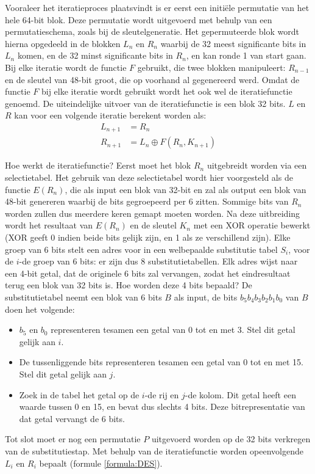 \documentclass{report}
\begin{document}
	Vooraleer het iteratieproces plaatsvindt is er eerst een initiële permutatie van het hele 64-bit blok. Deze permutatie wordt uitgevoerd met behulp van een permutatieschema, zoals bij de sleutelgeneratie. Het gepermuteerde blok wordt hierna opgedeeld in de blokken $L_n$ en $R_n$ waarbij de 32 meest significante bits in $L_n$ komen, en de 32 minst significante bits in $R_n$, en kan ronde 1 van start gaan. Bij elke iteratie wordt de functie $F$ gebruikt, die twee blokken manipuleert: $R_{n-1}$ en de sleutel van 48-bit groot, die op voorhand al gegenereerd werd. Omdat de functie $F$ bij elke iteratie wordt gebruikt wordt het ook wel de iteratiefunctie genoemd. De uiteindelijke uitvoer van de iteratiefunctie is een blok 32 bits. $L$ en $R$ kan voor een volgende iteratie berekent worden als:
	\begin{equation}
		\begin{split}
			L_{n + 1} & = R_{n} \\
			R_{n + 1} & = L_{n} \mathbin{\oplus} F(R_{n}, K_{n + 1})
		\end{split}
		\label{formula:DES}
	\end{equation}

	Hoe werkt de iteratiefunctie? Eerst moet het blok $R_n$ uitgebreidt worden via een selectietabel. Het gebruik van deze selectietabel wordt hier voorgesteld als de functie $E(R_n)$, die als input een blok van 32-bit en zal als output een blok van 48-bit genereren waarbij de bits gegroepeerd per 6 zitten. Sommige bits van $R_n$ worden zullen dus meerdere keren gemapt moeten worden. Na deze uitbreiding wordt het resultaat van $E(R_n)$ en de sleutel $K_n$ met een XOR operatie bewerkt (XOR geeft 0 indien beide bits gelijk zijn, en 1 als ze verschillend zijn). Elke groep van 6 bits stelt een adres voor in een welbepaalde substitutie tabel $S_i$, voor de $i$-de groep van 6 bits: er zijn dus 8 substitutietabellen. Elk adres wijst naar een 4-bit getal, dat de originele 6 bits zal vervangen, zodat het eindresultaat terug een blok van 32 bits is. Hoe worden deze 4 bits bepaald? De substitutietabel neemt een blok van 6 bits $B$ als input, de bits $b_5b_4b_3b_2b_1b_0$ van $B$ doen het volgende:
	\begin{itemize}
		\item $b_5$ en $b_0$ representeren tesamen een getal van 0 tot en met 3. Stel dit getal gelijk aan $i$. 
		\item De tussenliggende bits representeren tesamen een getal van 0 tot en met 15. Stel dit getal gelijk aan $j$.
		\item Zoek in de tabel het getal op de $i$-de rij en $j$-de kolom. Dit getal heeft een waarde tussen 0 en 15, en bevat dus slechts 4 bits. Deze bitrepresentatie van dat getal vervangt de 6 bits.
	\end{itemize}
	Tot slot moet er nog een permutatie $P$ uitgevoerd worden op de 32 bits verkregen van de substitutiestap. Met behulp van de iteratiefunctie worden opeenvolgende $L_i$ en $R_i$ bepaalt (formule \ref{formula:DES}).
\end{document}
